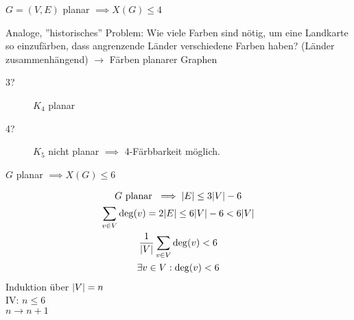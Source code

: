 \begin{satz*}
	$G=(V,E)$ planar $\implies X(G) \leq 4$
\end{satz*}
Analoge, ''historisches'' Problem: Wie viele Farben sind nötig, um eine Landkarte so einzufärben, dass angrenzende Länder verschiedene Farben haben? (Länder zusammenhängend) $\rightarrow$ Färben planarer Graphen

\begin{description}
	\item[3?] $K_4$ planar
	\item[4?] $K_5$ nicht planar $\implies$ 4-Färbbarkeit möglich.
\end{description}

\begin{satz*}
	$G$ planar $\implies X(G) \leq 6$\\
	\begin{bew}
		\begin{gather*}
			G \text{ planar } \implies \abs{E} \leq 3 \abs{V} - 6 \\
			\sum_{v \in V} \deg(v) = 2 \abs{E} \leq 6\abs{V} - 6 < 6\abs{V} \\
			\frac{1}{\abs{V}} \sum_{v \in V} \deg(v) < 6 \\
			\exists v \in V : \deg(v) < 6
		\end{gather*}
		Induktion über $\abs{V} = n$ \\
		IV: $n \leq 6$ \\
		$n \rightarrow n+1$
	\end{bew}
\end{satz*}
